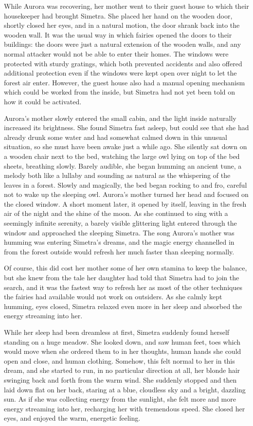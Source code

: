 While Aurora was recovering, her mother went to their guest house to which their housekeeper had brought Simetra. She placed her hand on the wooden door, shortly closed her eyes, and in a natural motion, the door shrank back into the wooden wall. It was the usual way in which fairies opened the doors to their buildings: the doors were just a natural extension of the wooden walls, and any normal attacker would not be able to enter their homes. The windows were protected with sturdy gratings, which both prevented accidents and also offered additional protection even if the windows were kept open over night to let the forest air enter. However, the guest house also had a manual opening mechanism which could be worked from the inside, but Simetra had not yet been told on how it could be activated.

Aurora's mother slowly entered the small cabin, and the light inside naturally increased its brightness. She found Simetra fast asleep, but could see that she had already drunk some water and had somewhat calmed down in this unusual situation, so she must have been awake just a while ago. She silently sat down on a wooden chair next to the bed, watching the large owl lying on top of the bed sheets, breathing slowly. Barely audible, she began humming an ancient tune, a melody both like a lullaby and sounding as natural as the whispering of the leaves in a forest. Slowly and magically, the bed began rocking to and fro, careful not to wake up the sleeping owl. Aurora's mother turned her head and focused on the closed window. A short moment later, it opened by itself, leaving in the fresh air of the night and the shine of the moon. As she continued to sing with a seemingly infinite serenity, a barely visible glittering light entered through the window and approached the sleeping Simetra. The song Aurora's mother was humming was entering Simetra's dreams, and the magic energy channelled in from the forest outside would refresh her much faster than sleeping normally.

Of course, this did cost her mother some of her own stamina to keep the balance, but she knew from the tale her daughter had told that Simetra had to join the search, and it was the fastest way to refresh her as most of the other techniques the fairies had available would not work on outsiders. As she calmly kept humming, eyes closed, Simetra relaxed even more in her sleep and absorbed the energy streaming into her.

\fancybreaker{}

While her sleep had been dreamless at first, Simetra suddenly found herself standing on a huge meadow. She looked down, and saw human feet, toes which would move when she ordered them to in her thoughts, human hands she could open and close, and human clothing. Somehow, this felt normal to her in this dream, and she started to run, in no particular direction at all, her blonde hair swinging back and forth from the warm wind. She suddenly stopped and then laid down flat on her back, staring at a blue, cloudless sky and a bright, dazzling sun. As if she was collecting energy from the sunlight, she felt more and more energy streaming into her, recharging her with tremendous speed. She closed her eyes, and enjoyed the warm, energetic feeling. 

